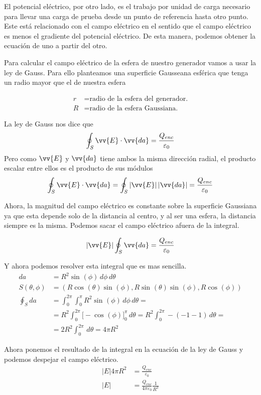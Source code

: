 \documentclass[12pt]{article}
\begin{document}
El potencial eléctrico, por otro lado, es el trabajo por unidad de carga necesario para llevar una carga de prueba desde un punto de referencia hasta otro punto. Este está relacionado con el campo eléctrico en el sentido que el campo eléctrico es menos el gradiente del potencial eléctrico. De esta manera, podemos obtener la ecuación de uno a partir del otro.

Para calcular el campo eléctrico de la esfera de nuestro generador vamos a usar la ley de Gauss. Para ello planteamos una superficie Gausseana esférica que tenga un radio mayor que el de nuestra esfera

\[
  \begin{aligned}
    r &= \text{radio de la esfera del generador.}\\
    R &= \text{radio de la esfera Gaussiana.}
  \end{aligned}
\]

La ley de Gauss nos dice que
\[
  \oint_S \vv{E}\cdot \vv{da} = \frac{Q_{enc}}{\varepsilon_0}
\]
Pero como $ \vv{E} $ y $ \vv{da} $ tiene ambos la misma dirección radial, el producto escalar entre ellos es el producto de sus módulos
\[
  \oint_S \vv{E}\cdot \vv{da} = \oint_S \left|\vv{E}\right| \left|\vv{da}\right| = \frac{Q_{enc}}{\varepsilon_0}
\]

Ahora, la magnitud del campo eléctrico es constante sobre la superficie Gaussiana ya que esta depende solo de la distancia al centro, y al ser una esfera, la distancia siempre es la misma. Podemos sacar el campo eléctrico afuera de la integral.

\[
  \left|\vv{E}\right| \oint_S \vv{da} = \frac{Q_{enc}}{\varepsilon_0}
\]

Y ahora podemos resolver esta integral que es mas sencilla.
\begin{align*}
  da &= R^2\sin^{}(\phi)\,d\phi\,d\theta\\
  S(\theta,\phi) &= (R\cos^{}(\theta)\sin^{}(\phi),R\sin^{}(\theta)\sin^{}(\phi),R\cos^{}(\phi))\\
  \oint_S da &= \int_{0}^{2\pi} \int_{0}^{\pi} R^2\sin^{}(\phi) \,d\phi\,d\theta =\\
   &= R^2\int_{0}^{2\pi} \Bigg[-\cos^{}(\phi)\Bigg]_{0}^{\pi} \,d\theta = R^2 \int_{0}^{2\pi} -(-1-1) \,d\theta =\\
   &= 2R^2 \int_{0}^{2\pi}  \,d\theta = 4\pi R^2
\end{align*}

Ahora ponemos el resultado de la integral en la ecuación de la ley de Gauss y podemos despejar el campo eléctrico.
\begin{align*}
  \left|E\right| 4\pi R^2 &= \frac{Q_{enc}}{\varepsilon_0}\\
  \left|E\right| &= \frac{Q_{enc}}{4\pi\varepsilon_0} \frac{1}{R^2}
\end{align*}
\end{document}
